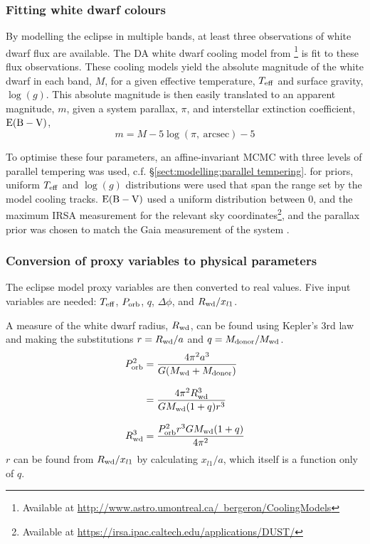 \subsubsection{Fitting white dwarf colours}
\label{sect:modelling:fitting white dwarf colours}
By modelling the eclipse in multiple bands, at least three observations of white dwarf flux are available.
The DA white dwarf cooling model from \citet{Bergeron1995}\footnote{Available at \href{http://www.astro.umontreal.ca/~bergeron/CoolingModels}{http://www.astro.umontreal.ca/~bergeron/CoolingModels}} is fit to these flux observations.
These cooling models yield the absolute magnitude of the white dwarf in each band, $M$, for a given effective temperature, $T_{\rm eff}$ and surface gravity, $\log (g)$. This absolute magnitude is then easily translated to an apparent magnitude, $m$, given a system parallax, $\pi$, and interstellar extinction coefficient, ${\rm E(B-V)}$,
\begin{equation}
    m = M - 5\log (\pi\mathrm{,\ arcsec}) - 5
\end{equation}

To optimise these four parameters, an affine-invariant MCMC with three levels of parallel tempering was used, c.f. \S\ref{sect:modelling:parallel tempering}. for priors, uniform $T_{\rm eff}$ and $\log (g)$ distributions were used that span the range set by the model cooling tracks. ${\rm E(B-V)}$ used a uniform distribution between 0, and the maximum IRSA measurement for the relevant sky coordinates\footnote{Available at \href{https://irsa.ipac.caltech.edu/applications/DUST/}{https://irsa.ipac.caltech.edu/applications/DUST/}}, and the parallax prior was chosen to match the Gaia measurement of the system \citep{lindegren2018, Luri2018, Gaia2016, Gaia2018}.

\subsubsection{Conversion of proxy variables to physical parameters}
\label{sect:modelling:conversion to physical parameters}
The eclipse model proxy variables are then converted to real values.
Five input variables are needed: $T_{\rm eff}$, $P_{\rm orb}$, $q$, $\Delta \phi$, and $R_{\rm wd} / x_{l1}$.


A measure of the white dwarf radius, $R_{\rm wd}$, can be found using Kepler's 3rd law and making the substitutions $r = R_{\rm wd} / a$ and $q = M_{\rm donor} / M_{\rm wd}$.
\begin{align}
    P_{\rm orb}^2 &= \frac{4 \pi^2 a^3}{G (M_{\rm wd} + M_{\rm donor})} \\[8pt]
    &= \frac{4 \pi^2 R_{\rm wd}^3}{G M_{\rm wd} (1 + q) r^3} \\[8pt]
    R_{\rm wd}^3 &= \frac{P_{\rm orb}^2 r^3 G M_{\rm wd} (1 + q) }{4 \pi^2}
    \label{eqn:modelling:geometric radius}
\end{align}
$r$ can be found from $R_{\rm wd} / x_{l1}$ by calculating $x_{l1} / a$, which itself is a function only of $q$.

